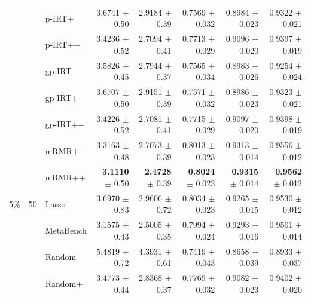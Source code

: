 \begin{longtable}{llp{}rrrrr}
 &  & p-IRT+ & 3.6741 {\scriptsize $\pm$ 0.50} & 2.9184 {\scriptsize $\pm$ 0.39} & 0.7569 {\scriptsize $\pm$ 0.032} & 0.8984 {\scriptsize $\pm$ 0.023} & 0.9322 {\scriptsize $\pm$ 0.021} \\
 &  & p-IRT++ & 3.4236 {\scriptsize $\pm$ 0.52} & 2.7094 {\scriptsize $\pm$ 0.41} & 0.7713 {\scriptsize $\pm$ 0.029} & 0.9096 {\scriptsize $\pm$ 0.020} & 0.9397 {\scriptsize $\pm$ 0.019} \\
 &  & gp-IRT & 3.5826 {\scriptsize $\pm$ 0.45} & 2.7944 {\scriptsize $\pm$ 0.37} & 0.7565 {\scriptsize $\pm$ 0.034} & 0.8983 {\scriptsize $\pm$ 0.026} & 0.9254 {\scriptsize $\pm$ 0.024} \\
 &  & gp-IRT+ & 3.6707 {\scriptsize $\pm$ 0.50} & 2.9151 {\scriptsize $\pm$ 0.39} & 0.7571 {\scriptsize $\pm$ 0.032} & 0.8986 {\scriptsize $\pm$ 0.023} & 0.9323 {\scriptsize $\pm$ 0.021} \\
 &  & gp-IRT++ & 3.4226 {\scriptsize $\pm$ 0.52} & 2.7081 {\scriptsize $\pm$ 0.41} & 0.7715 {\scriptsize $\pm$ 0.029} & 0.9097 {\scriptsize $\pm$ 0.020} & 0.9398 {\scriptsize $\pm$ 0.019} \\
 &  & mRMR+ & \underline{3.3163} {\scriptsize $\pm$ 0.48} & \underline{2.7073} {\scriptsize $\pm$ 0.39} & \underline{0.8013} {\scriptsize $\pm$ 0.023} & \underline{0.9313} {\scriptsize $\pm$ 0.014} & \underline{0.9556} {\scriptsize $\pm$ 0.012} \\
 &  & mRMR++ & \textbf{3.1110} {\scriptsize $\pm$ 0.50} & \textbf{2.4728} {\scriptsize $\pm$ 0.39} & \textbf{0.8024} {\scriptsize $\pm$ 0.023} & \textbf{0.9315} {\scriptsize $\pm$ 0.014} & \textbf{0.9562} {\scriptsize $\pm$ 0.012} \\
\midrule
5\% & 50 & Lasso & 3.6970 {\scriptsize $\pm$ 0.83} & 2.9606 {\scriptsize $\pm$ 0.72} & 0.8034 {\scriptsize $\pm$ 0.023} & 0.9265 {\scriptsize $\pm$ 0.015} & 0.9530 {\scriptsize $\pm$ 0.012} \\
 &  & MetaBench & 3.1575 {\scriptsize $\pm$ 0.43} & 2.5005 {\scriptsize $\pm$ 0.35} & 0.7994 {\scriptsize $\pm$ 0.024} & 0.9293 {\scriptsize $\pm$ 0.016} & 0.9501 {\scriptsize $\pm$ 0.014} \\
 &  & Random & 5.4819 {\scriptsize $\pm$ 0.72} & 4.3931 {\scriptsize $\pm$ 0.61} & 0.7419 {\scriptsize $\pm$ 0.043} & 0.8658 {\scriptsize $\pm$ 0.039} & 0.8933 {\scriptsize $\pm$ 0.037} \\
 &  & Random+ & 3.4773 {\scriptsize $\pm$ 0.44} & 2.8368 {\scriptsize $\pm$ 0.37} & 0.7769 {\scriptsize $\pm$ 0.032} & 0.9082 {\scriptsize $\pm$ 0.023} & 0.9402 {\scriptsize $\pm$ 0.020} \\

\end{longtable}

